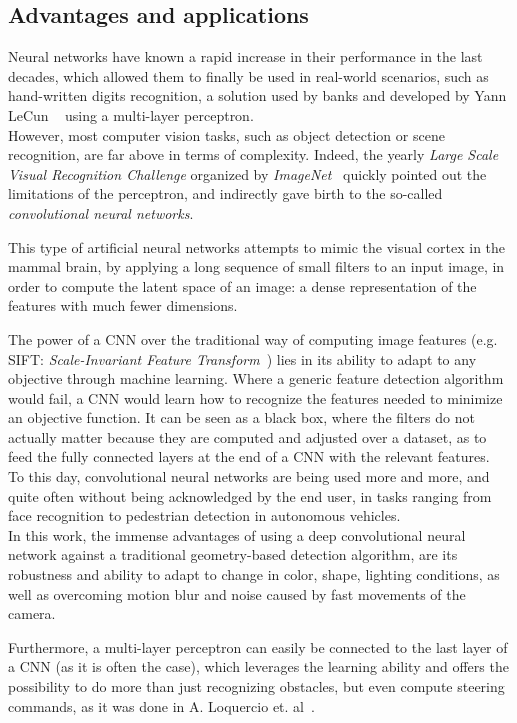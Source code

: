 \subsection{Advantages and applications}

Neural networks have known a rapid increase in their performance in the last
decades, which allowed them to finally be used in real-world scenarios, such as
hand-written digits recognition, a solution used by banks and developed by Yann
LeCun \etal~\cite{41400} using a multi-layer perceptron.\\

However, most computer vision tasks, such as object detection or scene
recognition, are far above in terms of complexity. Indeed, the yearly
\emph{Large Scale Visual Recognition Challenge} organized by
\emph{ImageNet}~\cite{1409.0575} quickly pointed out the limitations of the
perceptron, and indirectly gave birth to the so-called \emph{convolutional
neural networks}.

This type of artificial neural networks attempts to mimic the visual cortex in
the mammal brain, by applying a long sequence of small filters to an input
image, in order to compute the latent space of an image: a dense representation
of the features with much fewer dimensions.

The power of a CNN over the traditional way of computing image features (e.g.
SIFT: \emph{Scale-Invariant Feature Transform}~\cite{SIFT, SIFT_2}) lies in its ability
to adapt to any objective through machine learning. Where a generic feature
detection algorithm would fail, a CNN would learn how to recognize the features
needed to minimize an objective function. It can be seen as a black box, where
the filters do not actually matter because they are computed and adjusted over
a dataset, as to feed the fully connected layers at the end of a CNN with the
relevant features.\\

To this day, convolutional neural networks are being used more and more, and
quite often without being acknowledged by the end user, in tasks ranging from
face recognition to pedestrian detection in autonomous vehicles.\\

In this work, the immense advantages of using a deep convolutional neural network
against a traditional geometry-based detection algorithm, are its robustness and
ability to adapt to change in color, shape, lighting conditions, as well as
overcoming motion blur and noise caused by fast movements of the camera.

Furthermore, a multi-layer perceptron can easily be connected to the last layer
of a CNN (as it is often the case), which leverages the learning ability and
offers the possibility to do more than just recognizing obstacles, but even
compute steering commands, as it was done in A. Loquercio et. al~\cite{dronet}.
